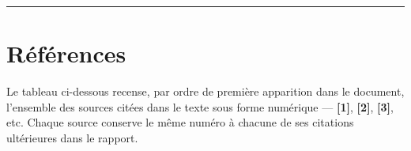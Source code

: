 \documentclass[12pt, a4paper]{report}
\begin{document}
\noindent\rule{\linewidth}{0.8pt}

\clearpage

\chapter*{Références}

\noindent
Le tableau ci-dessous recense, par ordre de première apparition dans le
document, l'ensemble des sources citées dans le texte sous forme numérique
--- \textbf{[1]}, \textbf{[2]}, \textbf{[3]}, etc. Chaque source conserve le
même numéro à chacune de ses citations ultérieures dans le rapport.

\vspace{6pt}
\end{document}

